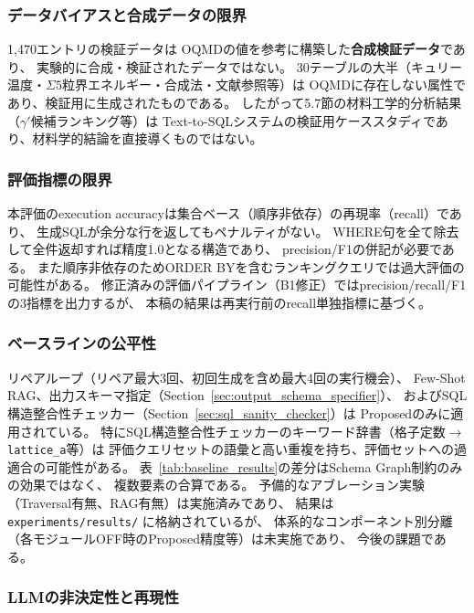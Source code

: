 \documentclass[5p,twocolumn]{elsarticle}
\begin{document}
\subsubsection{データバイアスと合成データの限界}

1{,}470エントリの検証データは
OQMDの値を参考に構築した\textbf{合成検証データ}であり、
実験的に合成・検証されたデータではない。
30テーブルの大半（キュリー温度・$\Sigma 5$粒界エネルギー・合成法・文献参照等）は
OQMDに存在しない属性であり、検証用に生成されたものである。
したがって5.7節の材料工学的分析結果（$\gamma'$候補ランキング等）は
Text-to-SQLシステムの検証用ケーススタディであり、材料学的結論を直接導くものではない。

\subsubsection{評価指標の限界}

本評価のexecution accuracyは集合ベース（順序非依存）の再現率（recall）であり、
生成SQLが余分な行を返してもペナルティがない。
WHERE句を全て除去して全件返却すれば精度1.0となる構造であり、
precision/F1の併記が必要である。
また順序非依存のためORDER BYを含むランキングクエリでは過大評価の可能性がある。
修正済みの評価パイプライン（B1修正）ではprecision/recall/F1の3指標を出力するが、
本稿の結果は再実行前のrecall単独指標に基づく。

\subsubsection{ベースラインの公平性}
\label{sec:fairness}

リペアループ（リペア最大3回、初回生成を含め最大4回の実行機会）、
Few-Shot RAG、出力スキーマ指定（Section~\ref{sec:output_schema_specifier}）、
およびSQL構造整合性チェッカー（Section~\ref{sec:sql_sanity_checker}）は
Proposedのみに適用されている。
特にSQL構造整合性チェッカーのキーワード辞書（格子定数$\to$\texttt{lattice\_a}等）は
評価クエリセットの語彙と高い重複を持ち、評価セットへの過適合の可能性がある。
表~\ref{tab:baseline_results}の差分はSchema Graph制約のみの効果ではなく、
複数要素の合算である。
予備的なアブレーション実験（Traversal有無、RAG有無）は実施済みであり、
結果は \texttt{experiments/results/} に格納されているが、
体系的なコンポーネント別分離（各モジュールOFF時のProposed精度等）は未実施であり、
今後の課題である。

\subsubsection{LLMの非決定性と再現性}
\label{sec:reproducibility}
\end{document}

